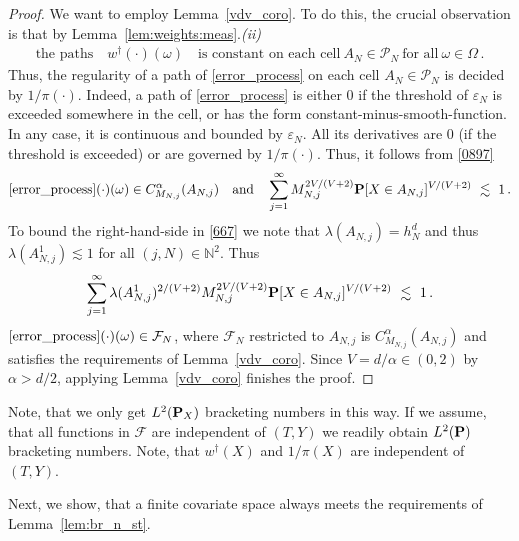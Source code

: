 \begin{proof}
  We want to employ Lemma~\ref{vdv_coro}. 
  To do this, the crucial observation is that by Lemma~\ref{lem:weights:meas}.\textit{(ii)}
  \begin{gather*}
    \text{the paths}\quad
    w^\dagger(\cdot)(\omega)
    \quad
    \text{is constant on each cell}\ 
    A_N\in\mathcal{P}_N
    \ \text{for all}\ \omega\in\Omega
    \,.
  \end{gather*}
  Thus, the regularity of a path of \eqref{error_process}
  on each cell $A_N\in\mathcal{P}_N$ is decided by 
  $1/\pi(\cdot)$.
  Indeed, a path of \eqref{error_process} is either 0 if the threshold of $\varepsilon_N$ is exceeded somewhere in the cell, or has the form constant-minus-smooth-function.
In any case, it is continuous and bounded by $\varepsilon_N$.
All its derivatives are 0 (if the threshold is exceeded) or are governed by $1/\pi(\cdot)$.
Thus, it follows from \eqref{0897}
\begin{gather}
  \eqref{error_process}(\cdot)(\omega)
  \in C^\alpha_{M_{N,j}}(A_{N,j})
  \quad
  \text{and}
  \quad
  \sum_{j=1}^{\infty} 
  M_{N,j}^{2V/(V+2)}
  \P
  [
  X\in A_{N,j}
  ]^{V/(V+2)}
  \ 
  \lesssim
  \ 
  1
  \,.
\end{gather}
To bound the right-hand-side in \eqref{667} we note
that 
$
\lambda(A_{N,j})=h^d_N
$ 
and thus
$
\lambda(A_{N,j}^1)\lesssim 1
$
for all $(j,N)\in\mathbb{N}^2$.
Thus
\begin{gather*}
  \sum_{j=1}^{\infty} 
  \lambda(A_{N,j}^1)^{2/(V+2)}
  M_{N,j}^{2V/(V+2)}
  \P
  [
  X\in A_{N,j}
  ]^{V/(V+2)}
  \ 
  \lesssim
  \ 
  1
  \,.
\end{gather*}
$
\eqref{error_process}(\cdot)(\omega)\in\mathcal{F}_N
$, 
where
$
\mathcal{F}_N
$
restricted to $A_{N,j}$ is 
$
  C^\alpha_{M_{N,j}}(A_{N,j})
$
and satisfies the requirements of Lemma~\ref{vdv_coro}.
Since $V=d/\alpha \in (0,2)$ by $\alpha>d/2$, 
applying Lemma~\ref{vdv_coro} finishes the proof.
\end{proof}
\begin{remark}
  Note, that we only get $L^2(\P_X)$ bracketing numbers in this way. If we assume, that all functions in $\mathcal{F}$ are independent of $(T,Y)$
  we readily obtain $L^2(\P)$ bracketing numbers. Note, that $w^\dagger(X)$ and $1/\pi(X)$ are independent of $(T,Y)$.  
\end{remark}
Next, we show, that a finite covariate space always meets the requirements of Lemma~\ref{lem:br_n_st}.
